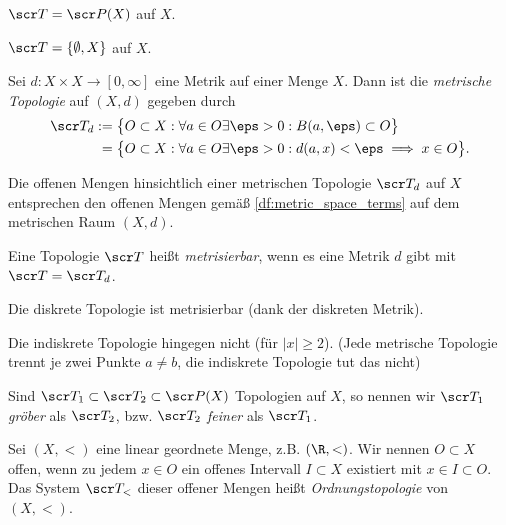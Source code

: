 \begin{ex}
	$\scr T = \scr P(X)$ auf $X$.
\end{ex}

\begin{ex}
	$\scr T = \{\emptyset, X\}$ auf $X$.
\end{ex}

\begin{ex} \label{ex:metric_topology}
	Sei $d: X \times X \to [0,\infty]$ eine Metrik auf einer Menge $X$.
	Dann ist die \emph{metrische Topologie} auf $(X,d)$ gegeben durch
	\begin{align*}
		\scr T_d
		&:= \big\{ O \subset X : \forall a \in O \exists \eps > 0 : B(a,\eps) \subset O \big\} \\
		&\;= \big\{ O \subset X : \forall a \in O \exists \eps > 0 : d(a,x) < \eps \implies x \in O \big\}.
	\end{align*}
	\begin{note}
		Die offenen Mengen hinsichtlich einer metrischen Topologie $\scr T_d$ auf $X$ entsprechen den offenen Mengen gemäß \ref{df:metric_space_terms} auf dem metrischen Raum $(X,d)$.
	\end{note}
\end{ex}

\begin{df}
	Eine Topologie $\scr T$ heißt \emph{metrisierbar}, wenn es eine Metrik $d$ gibt mit $\scr T = \scr T_d$.
\end{df}

\begin{ex}
	Die diskrete Topologie ist metrisierbar (dank der diskreten Metrik).

	Die indiskrete Topologie hingegen nicht (für $|x| \ge 2$).
	(Jede metrische Topologie trennt je zwei Punkte $a \neq b$, die indiskrete Topologie tut das nicht)
\end{ex}

\begin{df}
	Sind $\scr T_1 \subset \scr T_2 \subset \scr P(X)$ Topologien auf $X$, so nennen wir $\scr T_1$ \emph{gröber} als $\scr T_2$, bzw. $\scr T_2$ \emph{feiner} als $\scr T_1$.
\end{df}

\begin{ex}[Ordnungstopologie]
	Sei $(X,<)$ eine linear geordnete Menge, z.B. $(\R,<)$.
	Wir nennen $O \subset X$ offen, wenn zu jedem $x \in O$ ein offenes Intervall $I \subset X$ existiert mit $x \in I \subset O$.
	Das System $\scr T_<$ dieser offener Mengen heißt \emph{Ordnungstopologie} von $(X,<)$.
\end{ex}

